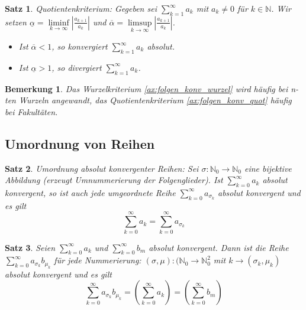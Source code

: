 \documentclass[12pt,a4paper]{report}%
\newtheorem{satz}{Satz}[section]
\newtheorem{bem}{Bemerkung}[section]
\numberwithin{equation}{section}
\newcommand{\N}{\mathbb{N}}
\numberwithin{equation}{subsection}
\begin{document}
	  \begin{satz}
	    Quotientenkriterium: Gegeben sei $\sum\limits_{k=1}^\infty a_k$ mit $a_k \neq 0$ für $k \in \N$. Wir setzen $\underline{\alpha} = \liminf\limits_{k \rightarrow \infty} \left| \frac{a_{k+1}}{a_k}\right|$ und $\overline{\alpha} = \limsup\limits_{k \rightarrow \infty} \left| \frac{a_{k+1}}{a_k}\right|$.
	    \begin{itemize}
	      \item[a) ] Ist $\overline{\alpha} < 1$, so konvergiert $\sum\limits_{k=1}^\infty a_k$ absolut.
	      \item[b) ] Ist $\underline{\alpha} > 1$, so divergiert $\sum\limits_{k=1}^\infty a_k$.
	    \end{itemize}\label{ax:folgen_konv_quot}
	  \end{satz}
    \begin{bem}
      Das Wurzelkriterium \eqref{ax:folgen_konv_wurzel} wird häufig bei n-ten Wurzeln angewandt, das Quotientenkriterium \eqref{ax:folgen_konv_quot} häufig bei Fakultäten.
    \end{bem}
  \subsection{Umordnung von Reihen}
  \begin{satz}
    Umordnung absolut konvergenter Reihen: Sei $\sigma: \N_0 \rightarrow \N_0$ eine bijektive Abbildung (erzeugt Umnummerierung der Folgenglieder). Ist $\sum\limits_{k=0}^\infty a_k$ absolut konvergent, so ist auch jede umgeordnete Reihe $\sum\limits_{k=0}^\infty a_{\sigma_k}$ absolut konvergent und es gilt
    \begin{equation}
      \sum\limits_{k=0}^\infty a_k = \sum\limits_{k=0}^\infty a_{\sigma_k}
    \end{equation}
  \end{satz}
  \begin{satz}
    Seien $\sum\limits_{k=0}^\infty a_k$ und $\sum\limits_{k=0}^\infty b_m$ absolut konvergent. Dann ist die Reihe $\sum\limits_{k=0}^\infty a_{\sigma_k} b_{\mu_k}$ für jede Nummerierung: $(\sigma,\mu):(\N_0 \rightarrow \N_0^2$ mit $k \rightarrow (\sigma_k, \mu_k)$ absolut konvergent und es gilt
    \begin{equation}
      \sum\limits_{k=0}^\infty a_{\sigma_k} b_{\mu_k} = \left(\sum\limits_{k=0}^\infty a_k \right) =  \left(\sum\limits_{k=0}^\infty b_m \right)
    \end{equation}
  \end{satz}
  
\end{document}

